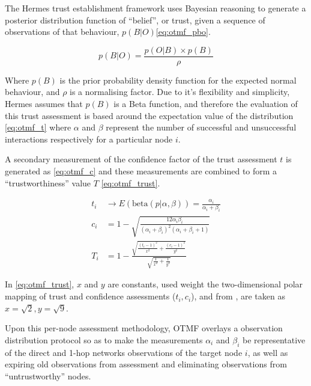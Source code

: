 \documentclass[conference]{IEEEtran}
\begin{document}
The Hermes trust establishment framework \cite{Zouridaki2005} uses Bayesian reasoning to generate a posterior distribution function of ``belief'', or trust, given a sequence of observations of that behaviour, $p(B|O)$\eqref{eq:otmf_pbo}.

\begin{equation}
  p(B|O)  = \frac{p(O|B) \times p(B)}{\rho}
  \label{eq:otmf_pbo}
\end{equation}

Where $p(B)$ is the prior probability density function for the expected normal behaviour, and $\rho$ is a normalising factor.
Due to it's flexibility and simplicity, Hermes assumes that $p(B)$ is a Beta function, and therefore the evaluation of this trust assessment is based around the expectation value of the distribution \eqref{eq:otmf_t}  where $\alpha$ and $\beta$ represent the number of successful and unsuccessful interactions respectively for a particular node $i$.

A secondary measurement of the confidence factor of the trust assessment $t$ is generated as \eqref{eq:otmf_c} and these measurements are combined to form a ``trustworthiness'' value $T$ \eqref{eq:otmf_trust}.

\begin{align}
  t_i &\to E(\text{beta}(p|\alpha,\beta)) = \frac{\alpha_i}{\alpha_i+\beta_i} \label{eq:otmf_t}\\[5pt]
  c_i &= 1 - \sqrt{\frac{12\alpha_i\beta_i}{(\alpha_i+\beta_i)^2(\alpha_i+\beta_i+1)}} \label{eq:otmf_c}\\[5pt]
  T_i &= 1 - \frac{\sqrt{\frac{(t_i-1)^2}{x^2} + \frac{(c_i-1)^2}{y^2}}}{\sqrt{\frac{1}{x^2}+\frac{1}{y^2}}} \label{eq:otmf_trust}
\end{align}

In \eqref{eq:otmf_trust}, $x$ and $y$ are constants, used weight the two-dimensional polar mapping of trust and confidence assessments ($t_i,c_i$), and from \cite{Zouridaki2005}, are taken as $x=\sqrt{2},y=\sqrt{9}$.

Upon this per-node assessment methodology, OTMF overlays a observation distribution protocol so as to make the measurements $\alpha_i$ and $\beta_i$ be representative of the direct and 1-hop networks observations of the target node $i$, as well as expiring old observations from assessment and eliminating observations from ``untrustworthy'' nodes.
\end{document}
